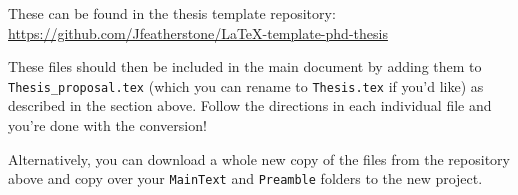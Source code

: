 These can be found in the thesis template repository:
\url{https://github.com/Jfeatherstone/LaTeX-template-phd-thesis}

These files should then be included in the main document by adding them
to \texttt{Thesis\_proposal.tex} (which you can rename to \texttt{Thesis.tex}
if you'd like) as described in the section above. Follow the directions
in each individual file and you're done with the conversion!

Alternatively, you can download a whole new copy of the files from the
repository above and copy over your \texttt{MainText} and \texttt{Preamble}
folders to the new project.
